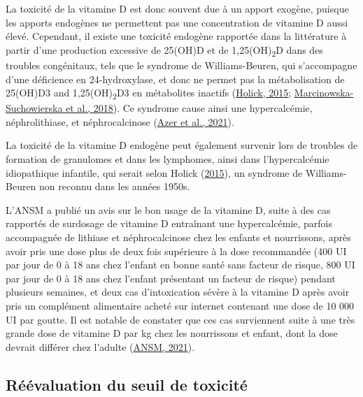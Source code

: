 \documentclass[
  a4paper,
  DIV=11,
  numbers=noendperiod,
  listof=totoc]{scrreprt}
\begin{document}
La toxicité de la vitamine D est donc souvent due à un apport exogène,
puisque les apports endogènes ne permettent pas une concentration de
vitamine D aussi élevé. Cependant, il existe une toxicité endogène
rapportée dans la littérature à partir d'une production excessive de
25(OH)D et de 1,25(OH)\textsubscript{2}D dans des troubles congénitaux,
tels que le syndrome de Williams-Beuren, qui s'accompagne d'une
déficience en 24-hydroxylase, et donc ne permet pas la métabolisation de
25(OH)D3 and 1,25(OH)\textsubscript{2}D3 en métabolites inactifs
(\protect\hyperlink{ref-Holick.2015}{Holick, 2015};
\protect\hyperlink{ref-Marcinowska-Suchowierska.2018}{Marcinowska-Suchowierska
et al., 2018}). Ce syndrome cause ainsi une hypercalcémie,
néphrolithiase, et néphrocalcinose
(\protect\hyperlink{ref-Azer.2021}{Azer et al., 2021}).

La toxicité de la vitamine D endogène peut également survenir lors de
troubles de formation de granulomes et dans les lymphomes, ainsi dans
l'hypercalcémie idiopathique infantile, qui serait selon Holick
(\protect\hyperlink{ref-Holick.2015}{2015}), un syndrome de
Williams-Beuren non reconnu dans les années 1950s.

L'ANSM a publié un avis sur le bon usage de la vitamine D, suite à des
cas rapportés de surdosage de vitamine D entraînant une hypercalcémie,
parfois accompagnée de lithiase et néphrocalcinose chez les enfants et
nourrissons, après avoir pris une dose plus de deux fois supérieure à la
dose recommandée (400 UI par jour de 0 à 18 ans chez l'enfant en bonne
santé sans facteur de risque, 800 UI par jour de 0 à 18 ans chez
l'enfant présentant un facteur de risque) pendant plusieurs semaines, et
deux cas d'intoxication sévère à la vitamine D après avoir pris un
complément alimentaire acheté sur internet contenant une dose de 10 000
UI par goutte. Il est notable de constater que ces cas surviennent suite
à une très grande dose de vitamine D par kg chez les nourrissons et
enfant, dont la dose devrait différer chez l'adulte
(\protect\hyperlink{ref-ANSM.2021}{ANSM, 2021}).

\hypertarget{ruxe9uxe9valuation-du-seuil-de-toxicituxe9}{%
\subsection{Réévaluation du seuil de
toxicité}\label{ruxe9uxe9valuation-du-seuil-de-toxicituxe9}}
\end{document}
